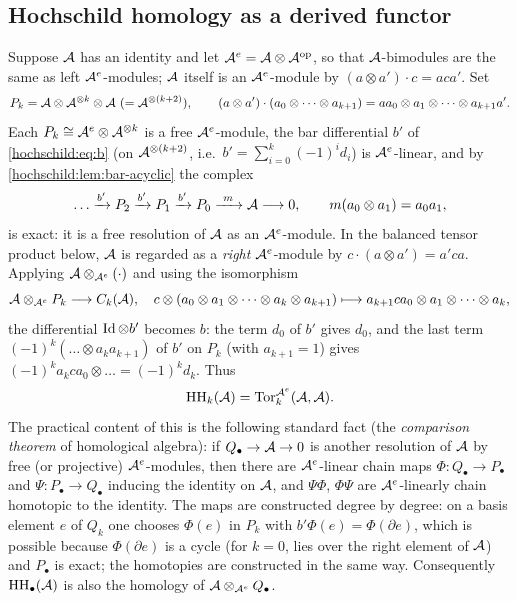 \subsection{Hochschild homology as a derived functor}
\label{hochschild:sec:Tor}
Suppose $\mathcal{A}$ has an identity and let $\mathcal{A}^e=\mathcal{A}\otimes\mathcal{A}^{\mathrm{op}}$, so that
$\mathcal{A}$-bimodules are the same as left $\mathcal{A}^e$-modules; $\mathcal{A}$ itself is an
$\mathcal{A}^e$-module by $(a\otimes a')\cdot c=aca'$. Set
\begin{equation*}
  P_k=\mathcal{A}\otimes\mathcal{A}^{\otimes k}\otimes\mathcal{A}\ (=\mathcal{A}^{\otimes(k+2)}),
  \qquad (a\otimes a')\cdot(a_0\otimes\dots\otimes a_{k+1})
  =aa_0\otimes a_1\otimes\dots\otimes a_{k+1}a'.
\end{equation*}
Each $P_k\cong\mathcal{A}^e\otimes\mathcal{A}^{\otimes k}$ is a free $\mathcal{A}^e$-module, the bar
differential $b'$ of \eqref{hochschild:eq:b} (on $\mathcal{A}^{\otimes(k+2)}$, i.e.\
$b'=\sum_{i=0}^{k}(-1)^id_i$) is $\mathcal{A}^e$-linear, and by
\cref{hochschild:lem:bar-acyclic} the complex
\begin{equation}
  \dots\xrightarrow{b'}P_2\xrightarrow{b'}P_1\xrightarrow{b'}P_0\xrightarrow{\ m\ }\cA\longrightarrow0,
  \qquad m(a_0\otimes a_1)=a_0a_1,
  \label{hochschild:eq:bar-res}
\end{equation}
is exact: it is a free resolution of $\mathcal{A}$ as an $\mathcal{A}^e$-module. In the
balanced tensor product below, $\mathcal{A}$ is regarded as a \emph{right}
$\mathcal{A}^e$-module by $c\cdot(a\otimes a')=a'ca$. Applying
$\mathcal{A}\otimes_{\mathcal{A}^e}(\cdot)$ and using the isomorphism
\begin{equation*}
  \mathcal{A}\otimes_{\mathcal{A}^e}P_k\longrightarrow C_k(\mathcal{A}),\quad
  c\otimes(a_0\otimes a_1\otimes\dots\otimes a_k\otimes a_{k+1})\longmapsto
  a_{k+1}ca_0\otimes a_1\otimes\dots\otimes a_k,
\end{equation*}
the differential $\operatorname{Id}\otimes b'$ becomes $b$: the term $d_0$ of $b'$ gives
$d_0$, and the last term $(-1)^k(\dots\otimes a_ka_{k+1})$ of $b'$ on $P_k$
(with $a_{k+1}=1$) gives $(-1)^ka_kca_0\otimes\dots=(-1)^kd_k$. Thus
\begin{equation*}
  \operatorname{HH}_k(\mathcal{A})=\operatorname{Tor}^{\mathcal{A}^e}_k(\mathcal{A},\mathcal{A}).
\end{equation*}
The practical content of this is the following standard fact
(the \emph{comparison theorem} of homological algebra): if
$Q_\bullet\to\mathcal{A}\to0$ is another resolution of $\mathcal{A}$ by free (or projective)
$\mathcal{A}^e$-modules, then there are $\mathcal{A}^e$-linear chain maps $\Phi:Q_\bullet\to
P_\bullet$ and $\Psi:P_\bullet\to Q_\bullet$ inducing the identity on $\mathcal{A}$,
and $\Psi\Phi$, $\Phi\Psi$ are $\mathcal{A}^e$-linearly chain homotopic to the
identity. The maps are constructed degree by degree: on a basis element $e$
of $Q_k$ one chooses $\Phi(e)$ in $P_k$ with $b'\Phi(e)=\Phi(\partial e)$,
which is possible because $\Phi(\partial e)$ is a cycle (for $k=0$, lies over
the right element of $\mathcal{A}$) and $P_\bullet$ is exact; the homotopies are
constructed in the same way. Consequently $\operatorname{HH}_\bullet(\mathcal{A})$ is also the
homology of $\mathcal{A}\otimes_{\mathcal{A}^e}Q_\bullet$.

